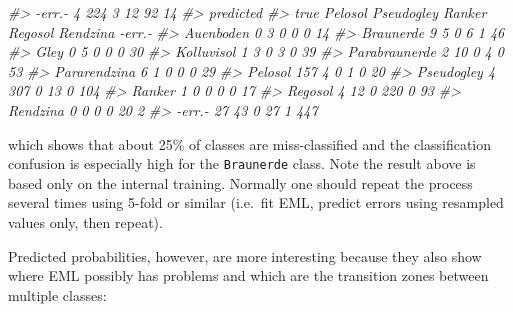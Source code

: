 \documentclass[
  graybox,natbib,nospthms]{svmono}
\newenvironment{Shaded}{\begin{snugshade}}{\end{snugshade}}
\newcommand{\AttributeTok}[1]{\textcolor[rgb]{0.61,0.61,0.61}{#1}}
\newcommand{\CommentTok}[1]{\textcolor[rgb]{0.37,0.37,0.37}{\textit{#1}}}
\newcommand{\DecValTok}[1]{\textcolor[rgb]{0.06,0.06,0.06}{#1}}
\newcommand{\FunctionTok}[1]{\textcolor[rgb]{0,0,0}{#1}}
\newcommand{\NormalTok}[1]{#1}
\newcommand{\SpecialCharTok}[1]{\textcolor[rgb]{0,0,0}{#1}}
\newcommand{\StringTok}[1]{\textcolor[rgb]{0.5,0.5,0.5}{#1}}
\begin{document}
\begin{Shaded}
\begin{Highlighting}[]
\CommentTok{\#\textgreater{}   {-}err.{-}                4       224    3         12            92           14}
\CommentTok{\#\textgreater{}                predicted}
\CommentTok{\#\textgreater{} true            Pelosol Pseudogley Ranker Regosol Rendzina {-}err.{-}}
\CommentTok{\#\textgreater{}   Auenboden           0          3      0       0        0     14}
\CommentTok{\#\textgreater{}   Braunerde           9          5      0       6        1     46}
\CommentTok{\#\textgreater{}   Gley                0          5      0       0        0     30}
\CommentTok{\#\textgreater{}   Kolluvisol          1          3      0       3        0     39}
\CommentTok{\#\textgreater{}   Parabraunerde       2         10      0       4        0     53}
\CommentTok{\#\textgreater{}   Pararendzina        6          1      0       0        0     29}
\CommentTok{\#\textgreater{}   Pelosol           157          4      0       1        0     20}
\CommentTok{\#\textgreater{}   Pseudogley          4        307      0      13        0    104}
\CommentTok{\#\textgreater{}   Ranker              1          0      0       0        0     17}
\CommentTok{\#\textgreater{}   Regosol             4         12      0     220        0     93}
\CommentTok{\#\textgreater{}   Rendzina            0          0      0       0       20      2}
\CommentTok{\#\textgreater{}   {-}err.{-}             27         43      0      27        1    447}
\end{Highlighting}
\end{Shaded}

which shows that about 25\% of classes are miss-classified and the classification
confusion is especially high for the \texttt{Braunerde} class. Note the result above is
based only on the internal training. Normally one should repeat the process
several times using 5-fold or similar (i.e.~fit EML, predict errors using resampled
values only, then repeat).

Predicted probabilities, however, are more interesting because they also show
where EML possibly has problems and which are the transition zones between multiple classes:

\begin{Shaded}
\end{Shaded}
\end{document}

